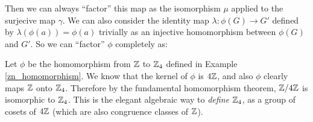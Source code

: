 \begin{center}
\end{center}

Then we can always ``factor'' this map as the isomorphism $\mu$ applied to the surjecive map $\gamma$. We can also consider the identity map $\lambda: \phi(G) \to G'$ defined by $\lambda(\phi(a)) = \phi(a)$ trivially as an injective homomorphism between $\phi(G)$ and $G'$. So we can ``factor'' $\phi$ completely as:

\begin{center}
\end{center}

\begin{example}
Let $\phi$ be the homomorphism from $\z$ to $\zn[4]$ defined in Example \ref{zn_homomorphism}. We know that the kernel of $\phi$ is $4\z$, and also $\phi$ clearly maps $\z$ onto $\zn[4]$. Therefore by the fundamental homomorphism theorem, $\z/4\z$ is isomorphic to $\zn[4]$. This is the elegant algebraic way to \textit{define} $\zn[4]$, as a group of cosets of $4\z$ (which are also congruence classes of $\z$).
\end{example}

